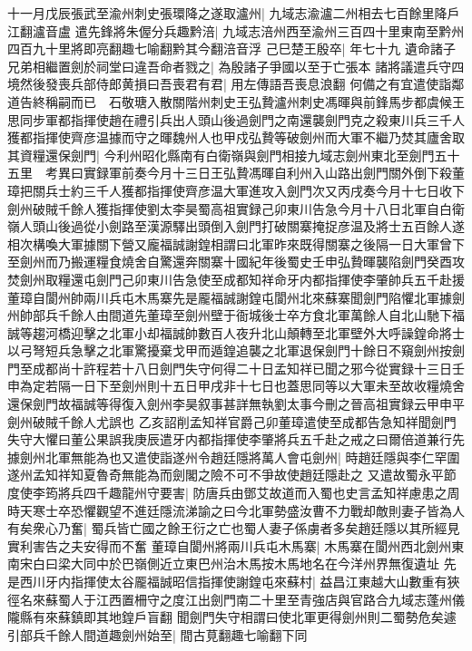 十一月戊辰張武至渝州刺史張環降之遂取瀘州|{
	九域志渝瀘二州相去七百餘里降戶江翻瀘音盧}
遣先鋒將朱偓分兵趣黔涪|{
	九域志涪州西至渝州三百四十里東南至黔州四百九十里將即亮翻趣七喻翻黔其今翻涪音浮}
己巳楚王殷卒|{
	年七十九}
遺命諸子兄弟相繼置劍於祠堂曰違吾命者戮之|{
	為殷諸子爭國以至于亡張本}
諸將議遣兵守四境然後發喪兵部侍郎黄損曰吾喪君有君|{
	用左傳語吾喪息浪翻}
何備之有宜遣使詣鄰道告終稱嗣而已　石敬瑭入散關階州刺史王弘贄瀘州刺史馮暉與前鋒馬步都虞候王思同步軍都指揮使趙在禮引兵出人頭山後過劍門之南還襲劍門克之殺東川兵三千人獲都指揮使齊彦温據而守之暉魏州人也甲戍弘贄等破劍州而大軍不繼乃焚其廬舍取其資糧還保劍門|{
	今利州昭化縣南有白衛嶺與劍門相接九域志劍州東北至劍門五十五里　考異曰實録軍前奏今月十三日王弘贄馮暉自利州入山路出劍門關外倒下殺董璋把關兵士約三千人獲都指揮使齊彦温大軍進攻入劍門次又丙戌奏今月十七日收下劍州破賊千餘人獲指揮使劉太李昊蜀高祖實録己卯東川告急今月十八日北軍自白衛嶺人頭山後過從小劍路至漢源驛出頭倒入劍門打破關寨掩捉彦温及將士五百餘人遂相次構喚大軍據關下營又龐福誠謝鍠相謂曰北軍昨來既得關寨之後隔一日大軍曾下至劍州而乃搬運糧食燒舍自驚還奔關寨十國紀年後蜀史壬申弘贄暉襲陷劍門癸酉攻焚劍州取糧還屯劍門己卯東川告急使至成都知祥命牙内都指揮使李肇帥兵五千赴援董璋自閬州帥兩川兵屯木馬寨先是龎福誠謝鍠屯閬州北來蘇寨聞劍門陷懼北軍據劍州帥部兵千餘人由間道先董璋至劍州壁于衙城後士卒方食北軍萬餘人自北山馳下福誠等趨河橋迎擊之北軍小却福誠帥數百人夜升北山顛轉至北軍壁外大呼譟鍠命將士以弓弩短兵急擊之北軍驚擾棄戈甲而遁鍠追襲之北軍退保劍門十餘日不窺劍州按劍門至成都尚十許程若十八日劍門失守何得二十日孟知祥已聞之邪今從實録十三日壬申為定若隔一日下至劍州則十五日甲戌非十七日也蓋思同等以大軍未至故收糧燒舍還保劍門故福誠等得復入劍州李昊叙事甚詳無執劉太事今刪之晉高祖實録云甲申平劍州破賊千餘人尤誤也}
乙亥詔削孟知祥官爵己卯董璋遣使至成都告急知祥聞劍門失守大懼曰董公果誤我庚辰遣牙内都指揮使李肇將兵五千赴之戒之曰爾倍道兼行先據劍州北軍無能為也又遣使詣遂州令趙廷隱將萬人會屯劍州|{
	時趙廷隱與李仁罕圍遂州孟知祥知夏魯奇無能為而劍閣之險不可不爭故使趙廷隱赴之}
又遣故蜀永平節度使李筠將兵四千趣龍州守要害|{
	防唐兵由鄧艾故道而入蜀也史言孟知祥慮患之周}
時天寒士卒恐懼觀望不進廷隱流涕諭之曰今北軍勢盛汝曹不力戰却敵則妻子皆為人有矣衆心乃奮|{
	蜀兵皆亡國之餘王衍之亡也蜀人妻子係虜者多矣趙廷隱以其所經見實利害告之夫安得而不奮}
董璋自閬州將兩川兵屯木馬寨|{
	木馬寨在閬州西北劍州東南宋白曰梁大同中於巴嶺側近立東巴州治木馬按木馬地名在今洋州界無復遺址}
先是西川牙内指揮使太谷龎福誠昭信指揮使謝鍠屯來蘇村|{
	益昌江東越大山數重有狹徑名來蘇蜀人于江西置柵守之度江出劍門南二十里至青強店與官路合九域志蓬州儀隴縣有來蘇鎮即其地鍠戶盲翻}
聞劍門失守相謂曰使北軍更得劍州則二蜀勢危矣遽引部兵千餘人間道趣劍州始至|{
	間古莧翻趣七喻翻下同}
